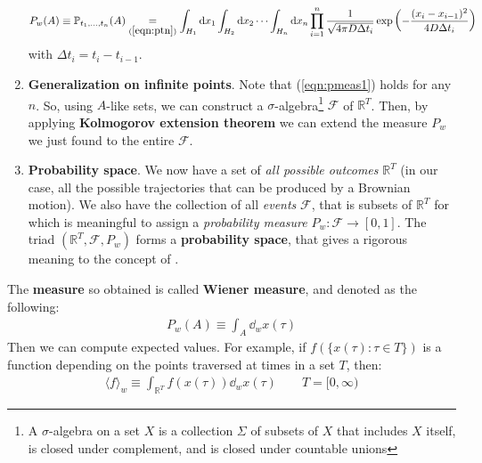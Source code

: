 \documentclass[../template.tex]{subfiles}
\begin{document}
\begin{enumerate}
\begin{align}
        P_w(A) \equiv \mathbb{P}_{t_1, \dots, t_n}(A) \underset{(\ref{eqn:ptn})}{=}  \int_{H_1} \dd{x_1}\int_{H_2}\dd{x_2} \cdots \int_{H_n} \dd{x_n} \prod_{i=1}^n \frac{1}{\sqrt{4 \pi D \Delta t_i}} \exp\left(-\frac{(x_i - x_{i-1})^2}{4 D \Delta t_i} \right) 
        \label{eqn:pmeas1}
    \end{align} 
    with $\Delta t_i = t_i - t_{i-1}$.
    \item \textbf{Generalization on infinite points}. Note that (\ref{eqn:pmeas1}) holds for any $n$. So, using $A$-like sets, we can construct a $\sigma$-algebra\footnote{A $\sigma$-algebra on a set $X$ is a collection $\Sigma$ of subsets of $X$ that includes $X$ itself, is closed under complement, and is closed under countable unions} $\mathcal{F}$ of $\mathbb{R}^T$. Then, by applying \textbf{Kolmogorov extension theorem} we can extend the measure $P_w$ we just found to the entire $\mathcal{F}$. 
    \item \textbf{Probability space}. We now have a set of \textit{all possible outcomes} $\mathbb{R}^T$ (in our case, all the possible trajectories that can be produced by a Brownian motion). We also have the collection of all \textit{events} $\mathcal{F}$, that is subsets of $\mathbb{R}^T$ for which is meaningful to assign a \textit{probability measure} $P_w \colon \mathcal{F} \to [0,1]$. The triad $(\mathbb{R}^T, \mathcal{F}, P_w)$ forms a \textbf{probability space}, that gives a rigorous meaning to the concept of .    
\end{enumerate}
The \textbf{measure} so obtained is called \textbf{Wiener measure}, and denoted as the following:
\begin{align*}
    P_w(A) \equiv \int_A \dd{_w}x(\tau)
\end{align*}  
Then we can compute expected values. For example, if $f(\{x(\tau)\colon \tau \in T\})$ is a function depending on the points traversed at times in a set $T$, then:  
\begin{align*}
    \langle f \rangle_w \equiv \int_{\mathbb{R}^T} f(x(\tau)) \dd{_w} x(\tau) \qquad T=[0,\infty)
\end{align*}
\end{document}
